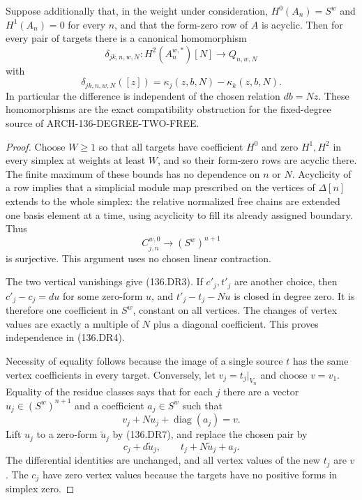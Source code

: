 Suppose additionally that, in the weight under consideration,
$H^0(A_n)=S^w$ and $H^1(A_n)=0$ for every $n$, and that the
form-zero row of $A$ is acyclic. Then for every pair of targets
there is a canonical homomorphism
\[
 \delta_{jk,n,w,N}:H^2(A_n^{w,*})[N]\longrightarrow Q_{n,w,N}
                                                               \tag{136.DR5}
\]
with
\[
 \delta_{jk,n,w,N}([z])=
                  \kappa_j(z,b,N)-\kappa_k(z,b,N).
                                                               \tag{136.DR6}
\]
In particular the difference is independent of the chosen relation
$db=Nz$. These homomorphisms are the exact compatibility obstruction
for the fixed-degree source of ARCH-136-DEGREE-TWO-FREE.

\begin{proof}
Choose $W\geq1$ so that all targets have coefficient $H^0$ and
zero $H^1,H^2$ in every simplex at weights at least $W$, and so
their form-zero rows are acyclic there. The finite maximum of
these bounds has no dependence on $n$ or $N$. Acyclicity of a row
implies that a simplicial module map prescribed on the vertices
of $\Delta[n]$ extends to the whole simplex: the relative
normalized free chains are extended one basis element at a time,
using acyclicity to fill its already assigned boundary. Thus
\[
                 C_{j,n}^{w,0}\longrightarrow(S^w)^{n+1}
                                                               \tag{136.DR7}
\]
is surjective. This argument uses no chosen linear contraction.

The two vertical vanishings give (136.DR3). If $c'_j,t'_j$ are
another choice, then $c'_j-c_j=du$ for some zero-form $u$, and
$t'_j-t_j-Nu$ is closed in degree zero. It is therefore one
coefficient in $S^w$, constant on all vertices. The changes of
vertex values are exactly a multiple of $N$ plus a diagonal
coefficient. This proves independence in (136.DR4).

Necessity of equality follows because the image of a single
source $t$ has the same vertex coefficients in every target.
Conversely, let $v_j=t_j|_{V_n}$ and choose $v=v_1$.
Equality of the residue classes says that for each $j$ there
are a vector $u_j\in(S^w)^{n+1}$ and a coefficient $a_j\in S^w$
such that
\[
                         v_j+Nu_j+\operatorname{diag}(a_j)=v.
\]
Lift $u_j$ to a zero-form $\widetilde u_j$ by (136.DR7), and
replace the chosen pair by
\[
 c_j+d\widetilde u_j,\qquad
                  t_j+N\widetilde u_j+a_j.
\]
The differential identities are unchanged, and all vertex
values of the new $t_j$ are $v$. The $c_j$ have zero vertex
values because the targets have no positive forms in simplex zero.


\end{proof}

